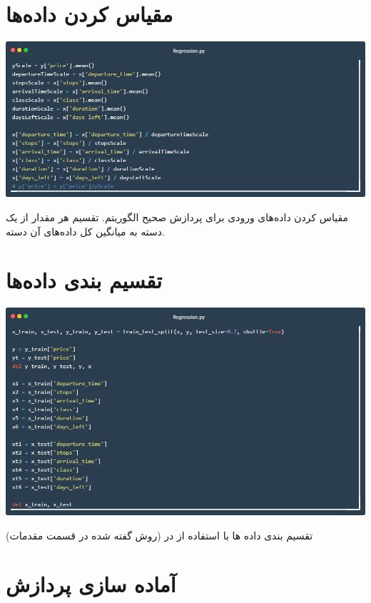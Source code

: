 \documentclass[12pt, dvipsnames, svgnames, x11names,]{article}
\begin{document}
	
	
	\section{مقیاس کردن داده‌ها}
	
		\includegraphics[width=14cm]{images/code04} \par
		{\normalsize 
			مقیاس کردن داده‌های ورودی برای پردازش صحیح الگوریتم.
			تقسیم هر مقدار از یک دسته به میانگین کل داده‌های آن دسته.
		}		
	
	
	
	\section{تقسیم بندی داده‌ها}
	
		\includegraphics[width=14cm]{images/code05} \par
		{\normalsize 
			تقسیم بندی داده ها با استفاده از  در  (روش گفته شده در قسمت مقدمات)
		}
	
	
	
	\section{آماده سازی پردازش} \label{pre_proccess}
	
\end{document}
